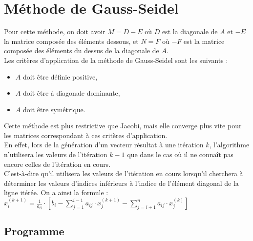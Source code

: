 \documentclass{report}
\begin{document}
  	\section{Méthode de Gauss-Seidel}
  	Pour cette méthode, on doit avoir $M=D-E$ où $D$ est la diagonale de $A$ et $-E$ la matrice composée des éléments dessous, et $N=F$ où $-F$ est la matrice composée des éléments du dessus de la diagonale de $A$.\\
      Les critères d'application de la méthode de Gauss-Seidel sont les suivants :
      \begin{itemize}
        \item{$A$ doit être définie positive,}
        \item{$A$ doit être à diagonale dominante,}
        \item{$A$ doit être symétrique.}
      \end{itemize}
      Cette méthode est plus restrictive que Jacobi, mais elle converge plus vite pour les matrices correspondant à ces critères d'application.\\
      
      En effet, lors de la génération d'un vecteur résultat à une itération $k$, l'algorithme n'utilisera les valeurs de l'itération $k-1$ que dans le cas où il ne connaît pas encore celles de l'itération en cours. \\
      
      C'est-à-dire qu'il utilisera les valeurs de l'itération en cours lorsqu'il cherchera à déterminer les valeurs d'indices inférieurs à l'indice de l'élément diagonal de la ligne itérée.
      On a ainsi la formule : 
      \newline
      $x_{i}^{(k+1)} = \frac{1}{a_{ii}} \cdot \left [ b_{i} - \sum_{j=1}^{i-1} a_{ij} \cdot x_{j}^{(k+1)} - \sum_{j=i+1}^{n} a_{ij} \cdot x_{j}^{(k)} \right ] $
      \newline
  	  \subsection{Programme}
        
      \newpage
\end{document}
